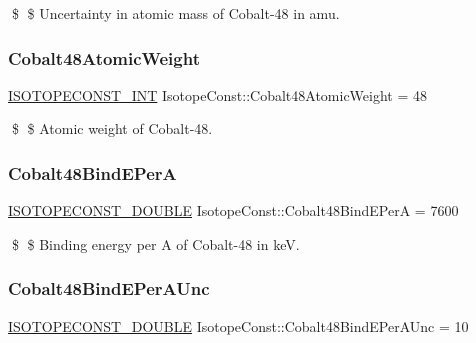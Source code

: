 \$ \$ Uncertainty in atomic mass of Cobalt-\/48 in amu. \mbox{\label{group___isotope_const-_cobalt-_co48_ga79b5548a2466cb33f655ae0cd4038ed1}} 
\subsubsection{\texorpdfstring{Cobalt48\+Atomic\+Weight}{Cobalt48AtomicWeight}}
{\footnotesize\ttfamily \mbox{\hyperlink{group___isotope_const-_macros_ga5f18360b3e99483a35c32d789e62621c}{I\+S\+O\+T\+O\+P\+E\+C\+O\+N\+S\+T\+\_\+\+I\+NT}} Isotope\+Const\+::\+Cobalt48\+Atomic\+Weight = 48}

\$ \$ Atomic weight of Cobalt-\/48. \mbox{\label{group___isotope_const-_cobalt-_co48_ga73bb8359e66c8ae08b770c2e7a017eee}} 
\subsubsection{\texorpdfstring{Cobalt48\+Bind\+E\+PerA}{Cobalt48BindEPerA}}
{\footnotesize\ttfamily \mbox{\hyperlink{group___isotope_const-_macros_ga8f45a7272ce02c0b4c65c44636ed719a}{I\+S\+O\+T\+O\+P\+E\+C\+O\+N\+S\+T\+\_\+\+D\+O\+U\+B\+LE}} Isotope\+Const\+::\+Cobalt48\+Bind\+E\+PerA = 7600}

\$ \$ Binding energy per A of Cobalt-\/48 in keV. \mbox{\label{group___isotope_const-_cobalt-_co48_ga953980243442b5cfb205230272490f8a}} 
\subsubsection{\texorpdfstring{Cobalt48\+Bind\+E\+Per\+A\+Unc}{Cobalt48BindEPerAUnc}}
{\footnotesize\ttfamily \mbox{\hyperlink{group___isotope_const-_macros_ga8f45a7272ce02c0b4c65c44636ed719a}{I\+S\+O\+T\+O\+P\+E\+C\+O\+N\+S\+T\+\_\+\+D\+O\+U\+B\+LE}} Isotope\+Const\+::\+Cobalt48\+Bind\+E\+Per\+A\+Unc = 10}

